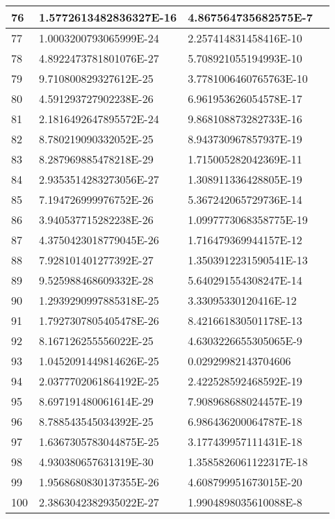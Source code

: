 \begin{center}
\begin{longtable}{ | l | l | l | l |}
76 &	1.5772613482836327E-16 &	4.867564735682575E-7 \\ \hline
77 &	1.0003200793065999E-24 &	2.257414831458416E-10 \\ \hline
78 &	4.8922473781801076E-27 &	5.708921055194993E-10 \\ \hline
79 &	9.710800829327612E-25 &	3.7781006460765763E-10 \\ \hline
80 &	4.591293727902238E-26 &	6.961953626054578E-17 \\ \hline
81 &	2.1816492647895572E-24 &	9.868108873282733E-16 \\ \hline
82 &	8.780219090332052E-25 &	8.943730967857937E-19 \\ \hline
83 &	8.287969885478218E-29 &	1.715005282042369E-11 \\ \hline
84 &	2.9353514283273056E-27 &	1.308911336428805E-19 \\ \hline
85 &	7.194726999976752E-26 &	5.367242065729736E-14 \\ \hline
86 &	3.940537715282238E-26 &	1.0997773068358775E-19 \\ \hline
87 &	4.3750423018779045E-26 &	1.716479369944157E-12 \\ \hline
88 &	7.928101401277392E-27 &	1.3503912231590541E-13 \\ \hline
89 &	9.525988468609332E-28 &	5.640291554308247E-14 \\ \hline
90 &	1.2939290997885318E-25 &	3.33095330120416E-12 \\ \hline
91 &	1.7927307805405478E-26 &	8.421661830501178E-13 \\ \hline
92 &	8.167126255556022E-25 &	4.6303226655305065E-9 \\ \hline
93 &	1.0452091449814626E-25 &	0.02929982143704606 \\ \hline
94 &	2.0377702061864192E-25 &	2.422528592468592E-19 \\ \hline
95 &	8.697191480061614E-29 &	7.908968688024457E-19 \\ \hline
96 &	8.788543545034392E-25 &	6.986436200064787E-18 \\ \hline
97 &	1.6367305783044875E-25 &	3.177439957111431E-18 \\ \hline
98 &	4.930380657631319E-30 &	1.3585826061122317E-18 \\ \hline
99 &	1.9568680830137355E-26 &	4.608799951673015E-20 \\ \hline
100 &	2.3863042382935022E-27 &	1.9904898035610088E-8 \\ \hline
\end{longtable}
\end{center}

